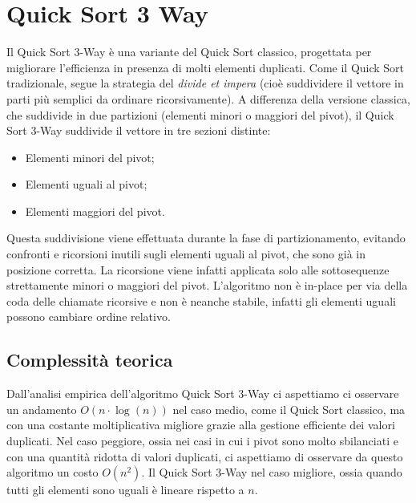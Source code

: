 \documentclass[a4paper, 12pt, oneside]{book}
\begin{document}



\chapter{Quick Sort 3 Way}\label{chap:Quick Sort 3 Way} %

Il Quick Sort 3-Way è una variante del Quick Sort classico, progettata per migliorare l'efficienza in presenza di molti elementi duplicati. Come il Quick Sort tradizionale, segue la strategia del \textit{divide et impera} (cioè suddividere il vettore in parti più semplici da ordinare ricorsivamente).
A differenza della versione classica, che suddivide in due partizioni (elementi minori o maggiori del pivot), il Quick Sort 3-Way suddivide il vettore in tre sezioni distinte:

\begin{itemize}
    \item Elementi minori del pivot;
    \item Elementi uguali al pivot;
    \item Elementi maggiori del pivot.
\end{itemize}

\noindent Questa suddivisione viene effettuata durante la fase di partizionamento, evitando confronti e ricorsioni inutili sugli elementi uguali al pivot, che sono già in posizione corretta. La ricorsione viene infatti applicata solo alle sottosequenze strettamente minori o maggiori del pivot.
L'algoritmo non è in-place per via della coda delle chiamate ricorsive e non è neanche stabile, infatti gli elementi uguali possono cambiare ordine relativo.

\section{Complessità teorica}

Dall'analisi empirica dell'algoritmo Quick Sort 3-Way ci aspettiamo ci osservare un andamento $O(n\cdot \log(n))$ nel caso medio, come il Quick Sort classico, ma con una costante moltiplicativa migliore grazie alla gestione efficiente dei valori duplicati. Nel caso peggiore, ossia nei casi in cui i pivot sono molto sbilanciati e con una quantità ridotta di valori duplicati, ci aspettiamo di osservare da questo algoritmo un costo $O(n^2)$. Il Quick Sort 3-Way nel caso migliore, ossia quando tutti gli elementi sono uguali è lineare rispetto a $n$.
\end{document}
